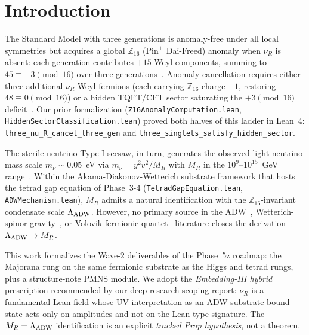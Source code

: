 \documentclass[aps,prd,twocolumn,showpacs,superscriptaddress,nofootinbib]{revtex4-2}
\newcommand{\SterileNu}{\nu_R}
\newcommand{\HeavyMaj}{M_R}
\newcommand{\LightNu}{m_\nu}
\newcommand{\LambdaADW}{\Lambda_{\rm ADW}}
\begin{document}
\maketitle

\section{Introduction}
\label{sec:intro}

The Standard Model with three generations is anomaly-free under all
local symmetries but acquires a global $\mathbb{Z}_{16}$
($\mathrm{Pin}^+$ Dai-Freed) anomaly when $\nu_R$ is absent: each
generation contributes $+15$ Weyl components, summing to
$45 \equiv -3 \pmod{16}$ over three generations~\cite{GarciaEtxebarriaMontero2019,WanWang2020}.
Anomaly cancellation requires either three additional $\nu_R$ Weyl
fermions (each carrying $\mathbb{Z}_{16}$ charge $+1$, restoring
$48 \equiv 0 \pmod{16}$) or a hidden TQFT/CFT sector saturating the
$+3 \pmod{16}$ deficit~\cite{WanWang2020,KawasakiYanagida2023}. Our prior
formalization (\texttt{Z16AnomalyComputation.lean},
\texttt{HiddenSectorClassification.lean}) proved both halves of this
ladder in Lean~4: \texttt{three\_nu\_R\_cancel\_three\_gen} and
\texttt{three\_singlets\_satisfy\_hidden\_sector}.

The sterile-neutrino Type-I seesaw, in turn, generates the observed
light-neutrino mass scale $\LightNu \sim 0.05$~eV via
$\LightNu = y^2 v^2 / \HeavyMaj$ with $\HeavyMaj$ in the
$10^9$--$10^{15}$~GeV range~\cite{MohapatraSmirnov2006}. Within the
Akama-Diakonov-Wetterich substrate framework that hosts the tetrad
gap equation of Phase~3-4 (\texttt{TetradGapEquation.lean},
\texttt{ADWMechanism.lean}), $\HeavyMaj$ admits a natural identification
with the $\mathbb{Z}_{16}$-invariant condensate scale $\LambdaADW$.
However, no primary source in the
ADW~\cite{ADW}, Wetterich-spinor-gravity~\cite{WetterichSpinor2013,WetterichSpinor2022},
or Volovik fermionic-quartet~\cite{Volovik2024Spinor} literature closes
the derivation $\LambdaADW \to \HeavyMaj$.

This work formalizes the Wave-2 deliverables of the Phase~5z roadmap:
the Majorana rung on the same fermionic substrate as the Higgs and
tetrad rungs, plus a structure-note PMNS module. We adopt the
\emph{Embedding-III hybrid} prescription recommended by our deep-research
scoping report: $\SterileNu$ is a fundamental Lean field whose UV
interpretation as an ADW-substrate bound state acts only on amplitudes
and not on the Lean type signature. The $\HeavyMaj = \LambdaADW$
identification is an explicit \emph{tracked Prop hypothesis}, not a
theorem.
\end{document}
